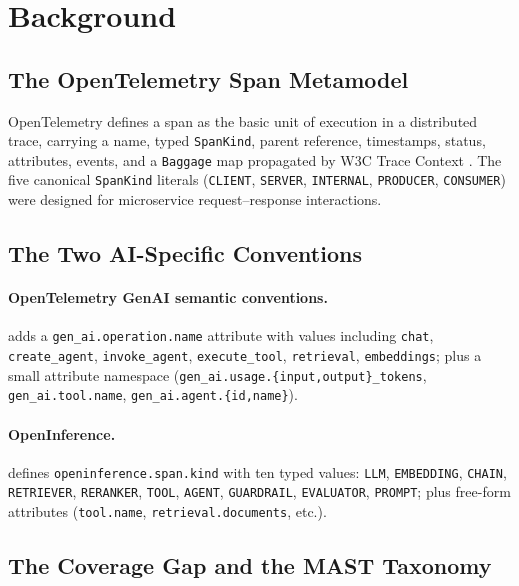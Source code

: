 \documentclass[a4paper,UKenglish,cleveref,autoref,thm-restate]{lipics-v2021}
\begin{document}
\section{Background}
\label{sec:background}

\subsection{The OpenTelemetry Span Metamodel}

OpenTelemetry defines a span as the basic unit of execution in a
distributed trace, carrying a name, typed \texttt{SpanKind}, parent
reference, timestamps, status, attributes, events, and a
\texttt{Baggage} map propagated by W3C Trace Context
\cite{anon-w3ctrace}.  The five canonical \texttt{SpanKind} literals
(\texttt{CLIENT}, \texttt{SERVER}, \texttt{INTERNAL},
\texttt{PRODUCER}, \texttt{CONSUMER}) were designed for
microservice request--response interactions.

\subsection{The Two AI-Specific Conventions}

\paragraph*{OpenTelemetry GenAI semantic conventions.}
\cite{anon-otelgenai} adds a \texttt{gen\_ai.operation.name}
attribute with values including \texttt{chat},
\texttt{create\_agent}, \texttt{invoke\_agent},
\texttt{execute\_tool}, \texttt{retrieval}, \texttt{embeddings};
plus a small attribute namespace
(\texttt{gen\_ai.usage.\{input,output\}\_tokens},
\texttt{gen\_ai.tool.name}, \texttt{gen\_ai.agent.\{id,name\}}).

\paragraph*{OpenInference.}  \cite{anon-openinference} defines
\texttt{openinference.span.kind} with ten typed values:
\texttt{LLM}, \texttt{EMBEDDING}, \texttt{CHAIN}, \texttt{RETRIEVER},
\texttt{RERANKER}, \texttt{TOOL}, \texttt{AGENT}, \texttt{GUARDRAIL},
\texttt{EVALUATOR}, \texttt{PROMPT}; plus free-form attributes
(\texttt{tool.name}, \texttt{retrieval.documents}, etc.).

\subsection{The Coverage Gap and the MAST Taxonomy}
\end{document}
